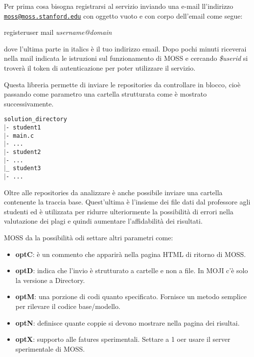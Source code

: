 			Per prima cosa bisogna registrarsi al servizio inviando una e-mail ll'indirizzo \href{mailto:moss@moss.stanford.edu}{\nolinkurl{moss@moss.stanford.edu}} con oggetto vuoto e con corpo dell'email come segue:
			\begin{tcolorbox}
				registeruser 
				mail \textit{username@domain}
			\end{tcolorbox}
			dove l'ultima parte in italics è il tuo indirizzo email.
			Dopo pochi minuti riceverai nella mail indicata le istruzioni sul funzionamento di MOSS e cercando \textit{\$userid} si troverà il token di autenticazione per poter utilizzare il servizio.
			
			Questa libreria permette di inviare le repositories da controllare in blocco, cioè passando come parametro una cartella strutturata come è mostrato successivamente.
			
			\begin{tcolorbox}
				\texttt{\tab solution\_directory\\ 
						\tab $\vert$- student1\\
						\tab[1.5cm] $\vert$- main.c\\
						\tab[1.5cm] $\vert$- ...\\
						\tab $\vert$- student2\\
						\tab[1.5cm] $\vert$- ...\\
						\tab $\vert$\_ student3\\
						\tab[1.5cm] $\vert$- ...
					}
			\end{tcolorbox}
			
			Oltre alle repositories da analizzare è anche possibile inviare una cartella contenente la traccia base. Quest'ultima è l'insieme dei file dati dal professore agli studenti ed è utilizzata per ridurre ulteriormente la possibilità di errori nella valutazione dei plagi e quindi aumentare l'affidabilità dei risultati.
			
			MOSS da la possibilità odi settare altri parametri come: 
			\begin{itemize}
				\item \textbf{optC}: è un commento che apparirà nella pagina HTML di ritorno di MOSS.
				\item \textbf{optD}: indica che l'invio è strutturato a cartelle e non a file. In MOJI c'è solo la versione a Directory.
				\item \textbf{optM}: una porzione di codi quanto specificato. Fornisce un metodo semplice per rilevare il codice base/modello.
				\item \textbf{optN}: definisce quante coppie si devono mostrare nella pagina dei risultai.
				\item \textbf{optX}: supporto alle fatures sperimentali. Settare a 1 oer usare il server sperimentale di MOSS.
			\end{itemize}
			
